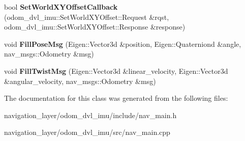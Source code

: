 \begin{DoxyCompactItemize}
bool {\bfseries Set\+World\+X\+Y\+Offset\+Callback} (odom\+\_\+dvl\+\_\+imu\+::\+Set\+World\+X\+Y\+Offset\+::\+Request \&rqst, odom\+\_\+dvl\+\_\+imu\+::\+Set\+World\+X\+Y\+Offset\+::\+Response \&response)
\item 
\mbox{\label{classnavigation_1_1NavigationNode_a1b38cdb0bbb2e1661baea64022d8aeb9}} 
void {\bfseries Fill\+Pose\+Msg} (Eigen\+::\+Vector3d \&position, Eigen\+::\+Quaterniond \&angle, nav\+\_\+msgs\+::\+Odometry \&msg)
\item 
\mbox{\label{classnavigation_1_1NavigationNode_a42d3e7b88af64af00c794938c1f76439}} 
void {\bfseries Fill\+Twist\+Msg} (Eigen\+::\+Vector3d \&linear\+\_\+velocity, Eigen\+::\+Vector3d \&angular\+\_\+velocity, nav\+\_\+msgs\+::\+Odometry \&msg)
\end{DoxyCompactItemize}


The documentation for this class was generated from the following files\+:\begin{DoxyCompactItemize}
\item 
navigation\+\_\+layer/odom\+\_\+dvl\+\_\+imu/include/nav\+\_\+main.\+h\item 
navigation\+\_\+layer/odom\+\_\+dvl\+\_\+imu/src/nav\+\_\+main.\+cpp\end{DoxyCompactItemize}

